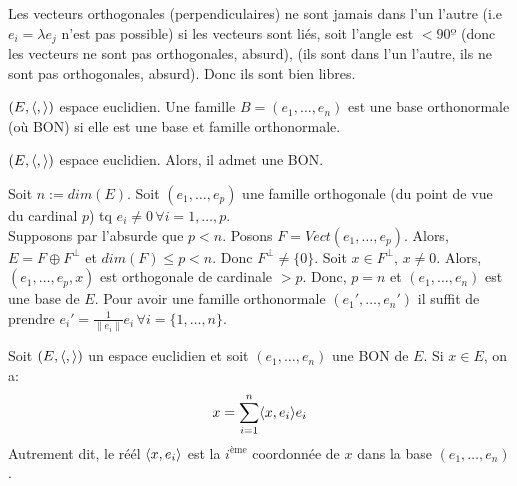 \begin{intuition}
   Les vecteurs orthogonales (perpendiculaires) ne sont jamais dans l'un l'autre (i.e $e_i = \lambda e_j$ n'est pas possible) si les vecteurs sont liés, soit l'angle est $< 90º$ (donc les vecteurs ne sont pas orthogonales, absurd), (ils sont dans l'un l'autre, ils ne sont pas orthogonales, absurd). Donc ils sont bien libres.
\end{intuition}
\begin{definition}
    $(E, \langle , \rangle)$ espace euclidien. Une famille  $B = (e_1, \ldots, e_n)$ est une base orthonormale (où BON) si elle est une base et famille orthonormale.
\end{definition}
\begin{theorem}
    $(E, \langle , \rangle)$ espace euclidien. Alors, il admet une BON.
\end{theorem}
\begin{preuve}
   Soit $n := dim(E)$. Soit  $(e_1, \ldots, e_p)$ une famille orthogonale (du point de vue du cardinal $p$) tq  $e_i \neq 0 \, \forall i = 1, \ldots, p$.\\
Supposons par l'absurde que $p < n$. Posons  $F = Vect(e_1, \ldots, e_p)$. Alors, $E = F \oplus F^{\perp}$ et  $dim(F) \le p < n$. Donc $F^{\perp} \neq  \{0\}$. Soit $x \in F^{\perp}, \, x \neq 0$. Alors, $(e_1, \ldots, e_p, x)$ est orthogonale de cardinale $> p$. Donc,  $p = n$ et  $(e_1, \ldots, e_n)$ est une base de $E$. Pour avoir une famille orthonormale  $(e_1', \ldots, e_n')$ il suffit de prendre $e_i' = \frac{1}{\|e_i\|}e_i \, \forall i = \{1, \ldots, n\}$.
\end{preuve}
\begin{prop}
    Soit $(E, \langle ,  \rangle)$ un espace euclidien et soit  $(e_1, \ldots, e_n)$ une BON de $E$. Si  $x \in E$, on a:
   \[
       x = \sum_{i=1}^{n} \langle x, e_i \rangle e_i
   \] 
Autrement dit, le réél $\langle x, e_i \rangle$ est la  $i^{\text{ème}}$ coordonnée de $x$ dans la base  $(e_1, \ldots, e_n)$.
\end{prop}
